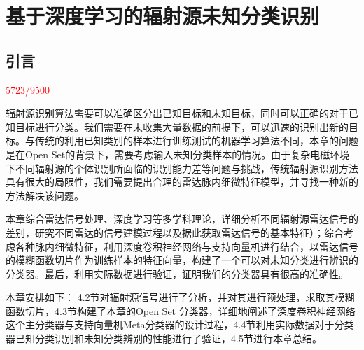 \chapter{基于深度学习的辐射源未知分类识别}




\section{引言}
\textcolor{red}{5723/9500}

辐射源识别算法需要可以准确区分出已知目标和未知目标，同时可以正确的对于已知目标进行分类。我们需要在未收集大量数据的前提下，可以迅速的识别出新的目标。与传统的利用已知类别的样本进行训练测试的机器学习算法不同，本章的问题是在Open Set的背景下，需要考虑输入未知分类样本的情况。由于复杂电磁环境下不同辐射源的个体识别所面临的识别能力差等问题与挑战，传统辐射源识别方法具有很大的局限性，我们需要提出合理的雷达脉内细微特征模型，并寻找一种新的方法解决该问题。

本章综合雷达信号处理、深度学习等多学科理论，详细分析不同辐射源雷达信号的差别，研究不同雷达的信号建模过程以及据此获取雷达信号的基本特征）；综合考虑各种脉内细微特征，利用深度卷积神经网络与支持向量机进行结合，以雷达信号的模糊函数切片作为训练样本的特征向量，构建了一个可以对未知分类进行辨识的分类器。最后，利用实际数据进行验证，证明我们的分类器具有很高的准确性。

本章安排如下： 4.2节对辐射源信号进行了分析，并对其进行预处理，求取其模糊函数切片，4.3节构建了本章的Open Set 分类器，详细地阐述了深度卷积神经网络这个主分类器与支持向量机Meta分类器的设计过程，4.4节利用实际数据对于分类器已知分类识别和未知分类辨别的性能进行了验证，4.5节进行本章总结。


